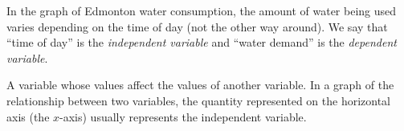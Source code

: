 %
%

In the graph of Edmonton water consumption, the amount of water being used varies depending on the time of day (not the other way around). We say that ``time of day'' is the \textit{independent variable} and ``water demand'' is the \textit{dependent variable}. 

\begin{boxdef}
A variable whose values affect the values of another variable. In a graph of the relationship between two variables, the quantity represented on the horizontal axis (the $x$-axis) usually represents the independent variable.
\end{boxdef}

